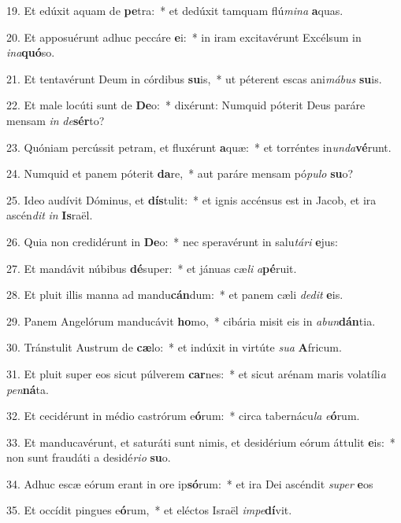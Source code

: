 19. Et edúxit aquam de \textbf{pe}tra:~*  et dedúxit tamquam flú\textit{mi}\textit{na} \textbf{a}quas.\

20. Et apposuérunt adhuc peccáre \textbf{e}i:~*  in iram excitavérunt Excélsum in \textit{in}\textit{a}\textbf{quó}so.\

21. Et tentavérunt Deum in córdibus \textbf{su}is,~*  ut péterent escas ani\textit{má}\textit{bus} \textbf{su}is.\

22. Et male locúti sunt de \textbf{De}o:~*  dixérunt: Numquid póterit Deus paráre mensam \textit{in} \textit{de}\textbf{sér}to?\

23. Quóniam percússit petram, et fluxérunt \textbf{a}quæ:~*  et torréntes in\textit{un}\textit{da}\textbf{vé}runt.\

24. Numquid et panem póterit \textbf{da}re,~*  aut paráre mensam pó\textit{pu}\textit{lo} \textbf{su}o?\

25. Ideo audívit Dóminus, et \textbf{dís}tulit:~*  et ignis accénsus est in Jacob, et ira ascén\textit{dit} \textit{in} \textbf{Is}raël.\

26. Quia non credidérunt in \textbf{De}o:~*  nec speravérunt in salu\textit{tá}\textit{ri} \textbf{e}jus:\

27. Et mandávit núbibus \textbf{dé}super:~*  et jánuas cæ\textit{li} \textit{a}\textbf{pé}ruit.\

28. Et pluit illis manna ad mandu\textbf{cán}dum:~*  et panem cæli \textit{de}\textit{dit} \textbf{e}is.\

29. Panem Angelórum manducávit \textbf{ho}mo,~*  cibária misit eis in \textit{ab}\textit{un}\textbf{dán}tia.\

30. Tránstulit Austrum de \textbf{cæ}lo:~*  et indúxit in virtúte \textit{su}\textit{a} \textbf{A}fricum.\

31. Et pluit super eos sicut púlverem \textbf{car}nes:~*  et sicut arénam maris volatíli\textit{a} \textit{pen}\textbf{ná}ta.\

32. Et cecidérunt in médio castrórum e\textbf{ó}rum:~*  circa tabernácu\textit{la} \textit{e}\textbf{ó}rum.\

33. Et manducavérunt, et saturáti sunt nimis, et desidérium eórum áttulit \textbf{e}is:~*  non sunt fraudáti a desidé\textit{ri}\textit{o} \textbf{su}o.\

34. Adhuc escæ eórum erant in ore ip\textbf{só}rum:~*  et ira Dei ascéndit \textit{su}\textit{per} \textbf{e}os\

35. Et occídit pingues e\textbf{ó}rum,~*  et eléctos Israël \textit{im}\textit{pe}\textbf{dí}vit.\

